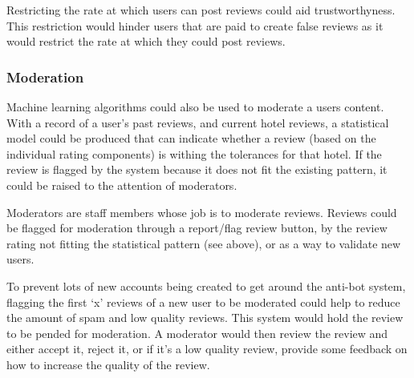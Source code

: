 \documentclass[a4paper]{article}
\begin{document}
Restricting the rate at which users can post reviews could aid trustworthyness.
This restriction would hinder users that are paid to create false reviews as it would restrict the rate at which they could post reviews.

\subsubsection{Moderation}
Machine learning algorithms could also be used to moderate a users content.
With a record of a user's past reviews, and current hotel reviews, a statistical model could be produced that can indicate whether a review (based on the individual rating components) is withing the tolerances for that hotel.
If the review is flagged by the system because it does not fit the existing pattern, it could be raised to the attention of moderators.

Moderators are staff members whose job is to moderate reviews.
Reviews could be flagged for moderation through a report/flag review button, by the review rating not fitting the statistical pattern (see above), or as a way to validate new users.

To prevent lots of new accounts being created to get around the anti-bot system, flagging the first `x' reviews of a new user to be moderated could help to reduce the amount of spam and low quality reviews.
This system would hold the review to be pended for moderation.
A moderator would then review the review and either accept it, reject it, or if it's a low quality review, provide some feedback on how to increase the quality of the review.
\end{document}
